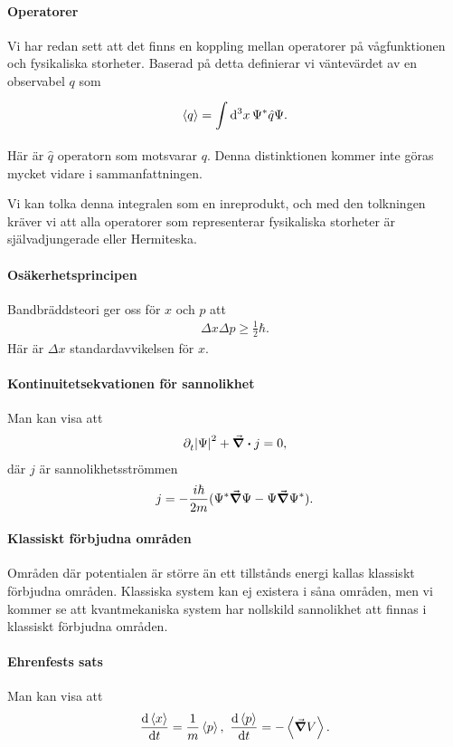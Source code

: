 \paragraph{Operatorer}
Vi har redan sett att det finns en koppling mellan operatorer på vågfunktionen och fysikaliska storheter. Baserad på detta definierar vi väntevärdet av en observabel $q$ som
\begin{align*}
	\expval{q} = \int\limits_{}^{}\dd[3]{x}\Psi^{*}\hat{q}\Psi.
\end{align*}
Här är $\hat{q}$ operatorn som motsvarar $q$. Denna distinktionen kommer inte göras mycket vidare i sammanfattningen.

Vi kan tolka denna integralen som en inreprodukt, och med den tolkningen kräver vi att alla operatorer som representerar fysikaliska storheter är självadjungerade eller Hermiteska.

\paragraph{Osäkerhetsprincipen}
Bandbräddsteori ger oss för $x$ och $p$ att
\begin{align*}
	\Delta x\Delta p \geq \frac{1}{2}\hbar.
\end{align*}
Här är $\Delta x$ standardavvikelsen för $x$.

\paragraph{Kontinuitetsekvationen för sannolikhet}
Man kan visa att
\begin{align*}
	\partial_{t}^{}\abs{\Psi}^{2} + \div{j} = 0,
\end{align*}
där $j$ är sannolikhetsströmmen
\begin{align*}
	j = -\frac{i\hbar}{2m}(\Psi^{*}\grad{\Psi} - \Psi\grad{\Psi^{*}}).
\end{align*}

\paragraph{Klassiskt förbjudna områden}
Områden där potentialen är större än ett tillstånds energi kallas klassiskt förbjudna områden. Klassiska system kan ej existera i såna områden, men vi kommer se att kvantmekaniska system har nollskild sannolikhet att finnas i klassiskt förbjudna områden.

\paragraph{Ehrenfests sats}
Man kan visa att
\begin{align*}
	\dv{\expval{x}}{t} = \frac{1}{m}\expval{p},\ \dv{\expval{p}}{t} = -\expval{\grad{V}}.
\end{align*}

